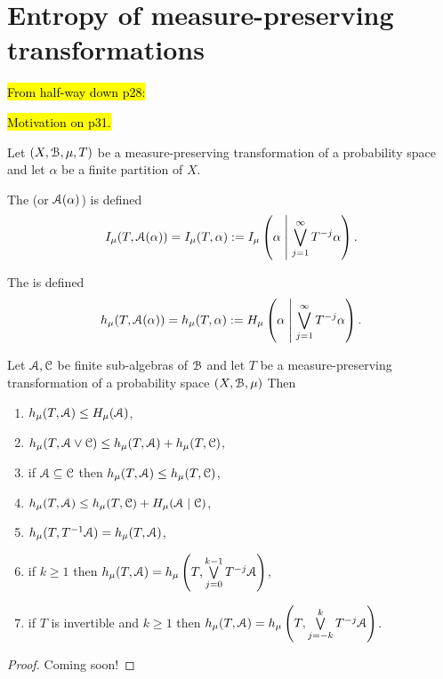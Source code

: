 \section{Entropy of measure-preserving transformations}
\hl{From half-way down p28:}

\hl{Motivation on p31.}

\begin{definition}
	Let $(X, \mathcal{B}, \mu, T)$ be a measure-preserving transformation of a probability space and let $\alpha$ be a finite partition of $X$.
	
	The  (or $\mathcal{A}(\alpha)$) is defined
	\[
		I_\mu(T, \mathcal{A}(\alpha)) = I_\mu(T, \alpha) := I_\mu\left(\alpha \mathrel{}\middle|\mathrel{} \bigvee_{j = 1}^\infty {T^{-j}{\alpha}}\right).
	\]
	
	The  is defined
	\[
		h_\mu(T, \mathcal{A}(\alpha)) = h_\mu(T, \alpha) := H_\mu\left(\alpha \mathrel{}\middle|\mathrel{} \bigvee_{j = 1}^\infty {T^{-j}{\alpha}}\right).
	\]
\end{definition}

\begin{theorem} \label{thm:walters-4.12}
	Let $\mathcal{A}, \mathcal{C}$ be finite sub-algebras of $\mathcal{B}$ and let $T$ be a measure-preserving transformation of a probability space $(X, \mathcal{B}, \mu)$ Then
	\begin{enumerate}
		\item $h_\mu(T, \mathcal{A}) \leq H_\mu(\mathcal{A})$, \label{walters:thm-4-12:1}
		\item $h_\mu(T, \mathcal{A} \vee \mathcal{C}) \leq h_\mu(T, \mathcal{A}) + h_\mu(T, \mathcal{C})$, \label{walters:thm-4-12:2}
		\item if $\mathcal{A} \subseteq \mathcal{C}$ then $h_\mu(T, \mathcal{A}) \leq h_\mu(T, \mathcal{C})$, \label{walters:thm-4-12:3}
		\item $h_\mu(T, \mathcal{A}) \leq h_\mu(T, \mathcal{C}) + H_\mu(\mathcal{A} \mid \mathcal{C})$, \label{walters:thm-4-12:4}
		\item $h_\mu(T, T^{-1}{\mathcal{A}}) = h_\mu(T, \mathcal{A})$, \label{walters:thm-4-12:5}
		\item if $k \geq 1$ then $h_\mu(T, \mathcal{A}) = h_\mu\left(T, \bigvee\limits_{j = 0}^{k - 1}{T^{-j}{\mathcal{A}}}\right)$, \label{walters:thm-4-12:6}
		\item if $T$ is invertible and $k \geq 1$ then $h_\mu(T, \mathcal{A}) = h_\mu\left(T, \bigvee\limits_{j = -k}^k{T^{-j}{\mathcal{A}}}\right)$. \label{walters:thm-4-12:7}
	\end{enumerate}
	\begin{proof}
		Coming soon!
	\end{proof}
\end{theorem}


